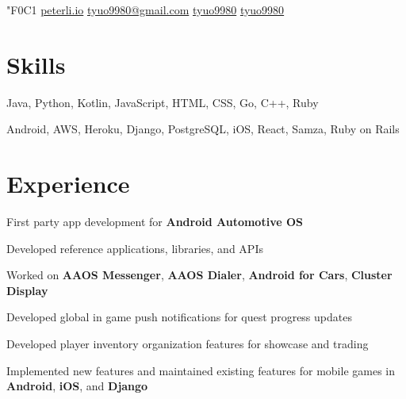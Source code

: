 \documentclass[]{peter_resume}
\begin{document}

{

   {\fa\char"F0C1} \href{http://peterli.io}{peterli.io}
     \href{mailto:tyuo9980@gmail.com}{tyuo9980@gmail.com}
     \href{https://github.com/tyuo9980}{tyuo9980}
     \href{https://www.linkedin.com/in/tyuo9980}{tyuo9980} 
}
\sectionsep
\vspace{0.3cm}

\begin{minipage}{\textwidth}


\section{Skills}
{\hspace{2.1cm} Java, Python, Kotlin, JavaScript, HTML, CSS, Go, C++, Ruby}
\vspace{0.1cm}

{\hspace{1.5cm} Android, AWS, Heroku, Django, PostgreSQL, iOS, React, Samza, Ruby on Rails}
\sectionsep


\section{Experience}
 
\vspace{\topsep} %
\begin{tightemize}
\item First party app development for \textbf{Android Automotive OS}
\item Developed reference applications, libraries, and APIs
\item Worked on \textbf{AAOS Messenger}, \textbf{AAOS Dialer}, \textbf{Android for Cars}, \textbf{Cluster Display}
\end{tightemize}
\sectionsep

 
\begin{tightemize}
\item Developed global in game push notifications for quest progress updates
\item Developed player inventory organization features for showcase and trading
\item Implemented new features and maintained existing features for mobile games in \textbf{Android}, \textbf{iOS}, and \textbf{Django} 
\end{tightemize}
\sectionsep


\end{minipage}
\end{document}
